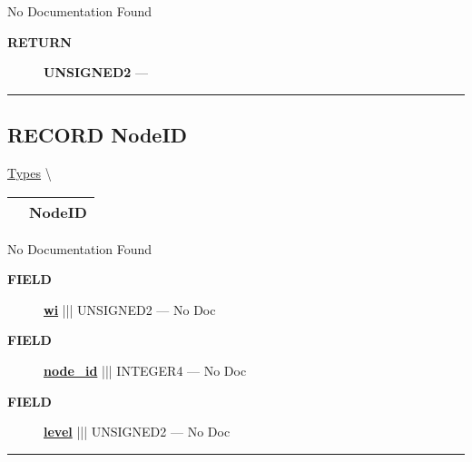 No Documentation Found








\par
\begin{description}
\item [\colorbox{tagtype}{\color{white} \textbf{\textsf{RETURN}}}] \textbf{UNSIGNED2} --- 
\end{description}




\rule{\linewidth}{0.5pt}
\subsection*{\textsf{\colorbox{headtoc}{\color{white} RECORD}
NodeID}}

\hypertarget{ecldoc:ml_core.types.nodeid}{}
\hspace{0pt} \hyperlink{ecldoc:ML_Core.Types}{Types} \textbackslash 

{\renewcommand{\arraystretch}{1.5}
\begin{tabularx}{\textwidth}{|>{\raggedright\arraybackslash}l|X|}
\hline
\hspace{0pt}\mytexttt{\color{red} } & \textbf{NodeID} \\
\hline
\end{tabularx}
}

\par





No Documentation Found







\par
\begin{description}
\item [\colorbox{tagtype}{\color{white} \textbf{\textsf{FIELD}}}] \textbf{\underline{wi}} ||| UNSIGNED2 --- No Doc
\item [\colorbox{tagtype}{\color{white} \textbf{\textsf{FIELD}}}] \textbf{\underline{node\_id}} ||| INTEGER4 --- No Doc
\item [\colorbox{tagtype}{\color{white} \textbf{\textsf{FIELD}}}] \textbf{\underline{level}} ||| UNSIGNED2 --- No Doc
\end{description}





\rule{\linewidth}{0.5pt}


